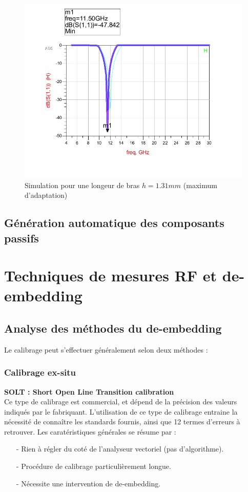 \documentclass[a4paper]{article}
\begin{document}
\begin{figure}[!htb]
\begin{center}
  \includegraphics[scale=0.45]{adaptation_height_1-31mm.png}
  \caption{Simulation pour une longeur de bras $h = 1.31 mm$ (maximum d'adaptation)}
  \label{adaptation_height_1-31mm}
\end{center}
\end{figure}

\clearpage
\subsection{G\'en\'eration automatique des composants passifs}


\clearpage
\section{Techniques de mesures RF et de-embedding}
\subsection{Analyse des m\'ethodes du de-embedding}
Le calibrage peut s'effectuer g\'en\'eralement selon deux m\'ethodes :

\subsubsection{Calibrage ex-situ}
\textbf{SOLT : Short Open Line Transition calibration} \\
Ce type de calibrage est commercial, et d\'epend de la pr\'ecision des valeurs indiqu\'es par le fabriquant.
L'utilisation de ce type de calibrage entraine la n\'ecessit\'e de conna\^itre les standards fournis, ainsi
que 12 termes d'erreurs \`a retrouver.
Les carat\'eristiques g\'en\'erales se r\'esume par :
\begin{itemize}
  \item[-] Rien \`a r\'egler du cot\'e de l'analyseur vectoriel (pas d'algorithme).
  \item[-] Proc\'edure de calibrage particuli\`erement longue.
  \item[-] N\'ecessite une intervention de de-embedding.
\end{itemize}
\end{document}
